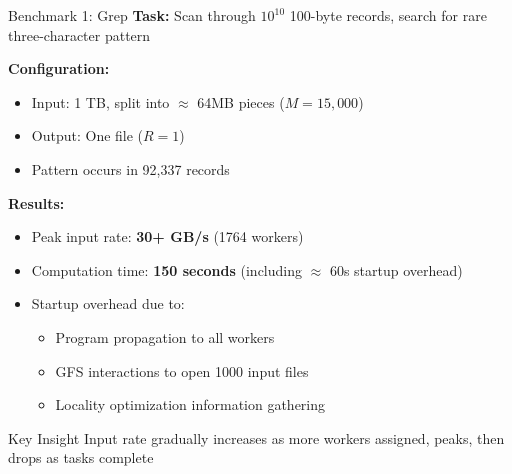 \documentclass[aspectratio=169]{beamer}
\begin{document}
\begin{frame}{Benchmark 1: Grep}
\textbf{Task:} Scan through $10^{10}$ 100-byte records, search for rare three-character pattern

\vspace{0.2cm}

\textbf{Configuration:}
\begin{itemize}
    \item Input: 1 TB, split into $\approx$ 64MB pieces ($M = 15,000$)
    \item Output: One file ($R = 1$)
    \item Pattern occurs in 92,337 records
\end{itemize}

\vspace{0.2cm}

\textbf{Results:}
\begin{itemize}
    \item Peak input rate: \textbf{30+ GB/s} (1764 workers)
    \item Computation time: \textbf{150 seconds} (including $\approx$ 60s startup overhead)
    \item Startup overhead due to:
    \begin{itemize}
        \item Program propagation to all workers
        \item GFS interactions to open 1000 input files
        \item Locality optimization information gathering
    \end{itemize}
\end{itemize}

\vspace{0.2cm}

\begin{alertblock}{Key Insight}
Input rate gradually increases as more workers assigned, peaks, then drops as tasks complete
\end{alertblock}
\end{frame}
\end{document}
